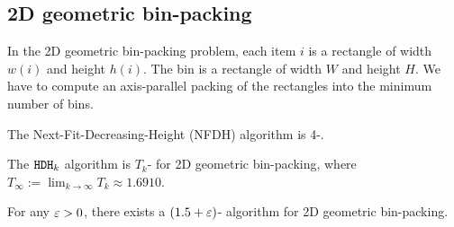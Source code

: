 \subsection{2D geometric bin-packing}

In the 2D geometric bin-packing problem, each item $i$ is a rectangle of width $w(i)$
and height $h(i)$. The bin is a rectangle of width $W$ and height $H$.
We have to compute an axis-parallel packing of the rectangles into the minimum number of bins.

\begin{theorem}
The Next-Fit-Decreasing-Height (NFDH) algorithm is 4-\asymAppx.
\end{theorem}
\begin{theorem}
The $\operatorname{\mathtt{HDH}}_k$ algorithm is $T_k$-\asymAppx{} for 2D geometric bin-packing,
where $T_{\infty} := \lim_{k \to \infty} T_k \approx 1.6910$.
\end{theorem}
\begin{optional}
\begin{theorem}
For any $\varepsilon > 0$, there exists a $(1.5+\varepsilon)$-\asymAppx{}
algorithm for 2D geometric bin-packing.
\end{theorem}
\end{optional}
